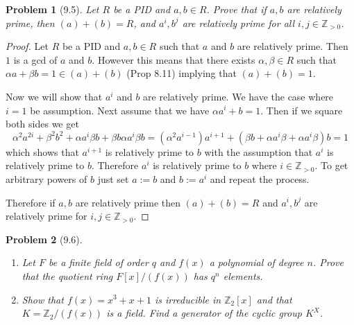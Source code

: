 \documentclass[10pt]{article}
\newcommand{\sk}{\vskip 10mm}
\newcommand{\bb}[1]{\mathbb{#1}}
\theoremstyle{plain}
\newtheorem{problem}{Problem}
\theoremstyle{remark}
\begin{document}
\sk


\begin{problem}[9.5]
  Let $R$ be a PID and $a,b\in R$. Prove that if $a,b$ are relatively
  prime, then $(a)+(b)=R$, and $a^i,b^j$ are relatively prime for all
  $i,j\in\bb{Z}_{>0}$.
\end{problem}

\begin{proof}
  Let $R$ be a PID and $a,b\in R$ such that $a$ and $b$ are relatively prime.
  Then $1$ is a gcd of $a$ and $b$. However this means that
  there exists $\alpha,\beta\in R$ such that $\alpha a+\beta b = 1\in (a)+(b)$ (Prop 8.11) implying that
  $(a)+(b)=1$.

  Now we will show that $a^i$ and $b$ are relatively prime. We have the case where
  $i=1$ be assumption. Next assume that we have $\alpha a^i+b=1$. Then if we square
  both sides we get
  \[ \alpha^2a^{2i}+\beta^2b^2+\alpha a^i\beta b+\beta b \alpha a^i \beta b = (\alpha^2a^{i-1})a^{i+1}+(\beta b+\alpha a^i \beta +\alpha a^i\beta)b=1 \]
  which shows that $a^{i+1}$ is relatively prime to $b$ with the assumption that
  $a^i$ is relatively prime to $b$. Therefore $a^i$ is relatively prime to $b$ where
  $i\in \bb{Z}_{>0}$. To get arbitrary powers of $b$ just set $a:=b$ and $b:=a^i$
  and repeat the process.

  Therefore if $a,b$ are relatively prime then $(a)+(b)=R$ and $a^i,b^j$ are relatively
  prime for $i,j\in\bb{Z}_{>0}$.
\end{proof}

\sk


\begin{problem}[9.6]
  \begin{enumerate}
  \item Let $F$ be a finite field of order $q$ and $f(x)$ a polynomial of degree
    $n$. Prove that the quotient ring $F[x]/(f(x))$ has $q^n$ elements.
  \item Show that $f(x)=x^3+x+1$ is irreducible in $\bb{Z}_2[x]$ and that
    $K=\bb{Z}_2/(f(x))$ is a field. Find a generator of the cyclic group
    $K^X$.
  \end{enumerate}
\end{problem}
\end{document}
